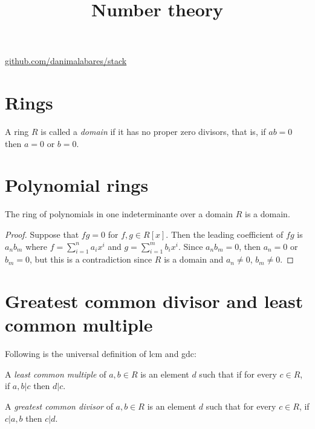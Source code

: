 



\title{Number theory}
\maketitle

\label{section-phantom}
\hfill
\href{http://github.com/danimalabares/stack}{github.com/danimalabares/stack}

\tableofcontents

\section{Rings}
\label{section-rings}

\begin{definition}
\label{definition-domain}
A ring $R$ is called a {\it domain} if it has no proper zero divisors,
that is, if $ab=0$ then $a=0$ or $b=0$.
\end{definition}

\section{Polynomial rings}
\label{section-polynomial-rings}

\begin{lemma}
\label{lemma-ring-of-polynomials-in-one-indeterminante-
over-domain-is-domain}
The ring of polynomials in one indeterminante over
a domain $R$ is a domain.
\end{lemma}

\begin{proof}
Suppose that $fg=0$ for $f,g \in R[x]$. Then 
the leading coefficient of $fg$ is $a_nb_m$
where $f=\sum_{i=1}^n a_ix^i$ and $g=\sum_{i=1}^mb_ix^i$.
Since $a_nb_m=0$, then $a_n=0$ or $b_m=0$,
but this is a contradiction since $R$ is a
domain and $a_n \neq 0$, $b_m \neq 0$.
\end{proof}

\section{Greatest common divisor and least common multiple}
\label{section-gcd-and-lcm}

Following is the universal definition of lcm and gdc:

\begin{definition}
\label{definition-lcm-and-gdc-universal}
A {\it least common multiple} of $a,b \in R$ is an element $d$ such that if for
every $c\in R$, if $a,b|c$ then $d|c$.

A {\it greatest common divisor} of $a,b \in R$ is an element $d$ such that
for every  $c \in R$,  if $c|a,b$ then  $c|d$.
\end{definition}

